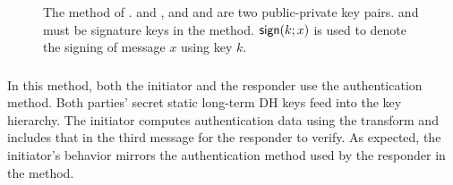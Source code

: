 \begin{figure}[!h]
{}
    \caption{The \mSigStat{} method of \mEdhoc. \mCredi{} and \mLtki, and
        \mCredr{} and \mLtkr{} are two public-private key pairs. \mCredi{} and
    \mLtki{} must be signature keys in the \mSig{} method. $\text{\textup{\textsf{sign}}}(k; x)$ is
    used to denote the signing of message $x$ using key $k$.}
\label{fig:edhocsigstat}
\end{figure}

\spacehack
\subsubsection{\mStatStat}
In this method, both the initiator and the responder use the \mStat{}
authentication method.
%
Both parties' secret static long-term DH keys feed into the key hierarchy.
%
The initiator computes authentication data using the \mAead{} transform
and includes that in the third message for the responder to verify.
%
As expected, the initiator's behavior mirrors the \mStat{} authentication method used by the responder in the \mSigStat{} method.
%

